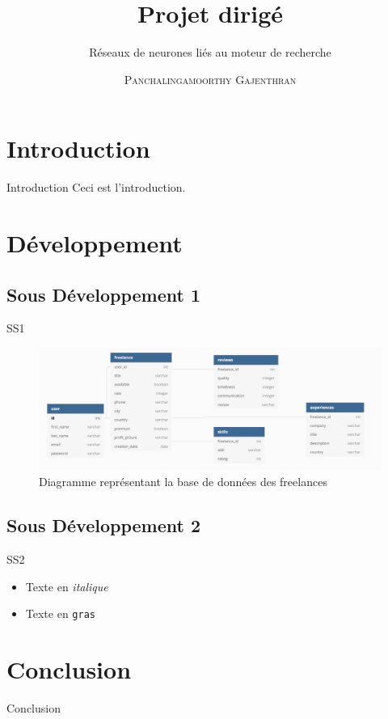\documentclass[xelatex,12pt]{beamer}
\title{Projet dirigé}
\subtitle{Réseaux de neurones liés au moteur de recherche}
\author[\textsc{P. Gajenthran}]{\textsc{Panchalingamoorthy Gajenthran}}
\institute{\normalsize Université Paris 8, LIASD}
\begin{document}
{ 
  \begin{frame}
  \titlepage
  \end{frame}

}

\section{Introduction}

\begin{frame}{Introduction}
Ceci est l'introduction.
\end{frame}

\section{Développement} 
\subsection{Sous Développement 1}
\begin{frame}{SS1}
  \begin{figure}[ht]
    \includegraphics[scale=0.33]{images/diagram}
    \caption{Diagramme représentant la base de données des freelances}
  \end{figure}
\end{frame}

\subsection{Sous Développement 2}
\begin{frame}{SS2}
  \begin{itemize}
    \item Texte en \textit{italique}
    \item Texte en \texttt{gras}
  \end{itemize}
\end{frame}

\section{Conclusion}
\begin{frame}{Conclusion}
\end{frame}
\end{document}

